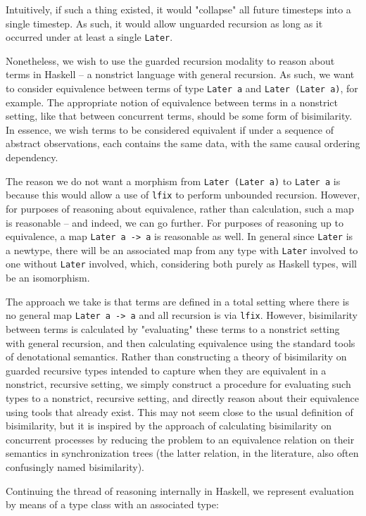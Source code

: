 \documentclass[sigplan,screen]{acmart}
\newcommand{\hs}{\texttt}
\begin{document}
Intuitively, if such a thing existed, it would "collapse" all future timesteps into a single timestep. As such, it would allow unguarded recursion as long as it occurred under at least a single \hs{Later}. 

Nonetheless, we wish to use the guarded recursion modality to reason about terms in Haskell -- a nonstrict language with general recursion. As such, we want to consider equivalence between terms of type \hs{Later a} and \hs{Later (Later a)}, for example. The appropriate notion of equivalence between terms in a nonstrict setting, like that between concurrent terms, should be some form of bisimilarity. In essence, we wish terms to be considered equivalent if under a sequence of abstract observations, each contains the same data, with the same causal ordering dependency. 

The reason we do not want a morphism from \hs{Later (Later a)} to \hs{Later a} is because this would allow a use of \hs{lfix} to perform unbounded recursion. However, for purposes of reasoning about equivalence, rather than calculation, such a map is reasonable -- and indeed, we can go further. For purposes of reasoning up to equivalence, a map \hs{Later a -> a} is reasonable as well. In general since \hs{Later} is a newtype, there will be an associated map from any type with \hs{Later} involved to one without \hs{Later} involved, which, considering both purely as Haskell types, will be an isomorphism. 

The approach we take is that terms are defined in a total setting where there is no general map \hs{Later a -> a} and all recursion is via \hs{lfix}. However, bisimilarity between terms is calculated by "evaluating" these terms to a nonstrict setting with general recursion, and then calculating equivalence using the standard tools of denotational semantics. Rather than constructing a theory of bisimilarity on guarded recursive types intended to capture when they are equivalent in a nonstrict, recursive setting, we simply construct a procedure for evaluating such types to a nonstrict, recursive setting, and directly reason about their equivalence using tools that already exist. This may not seem close to the usual definition of bisimilarity, but it is inspired by the approach of calculating bisimilarity on concurrent processes by reducing the problem to an equivalence relation on their semantics in synchronization trees (the latter relation, in the literature, also often confusingly named bisimilarity).

Continuing the thread of reasoning internally in Haskell, we represent evaluation by means of a type class with an associated type:
\end{document}
